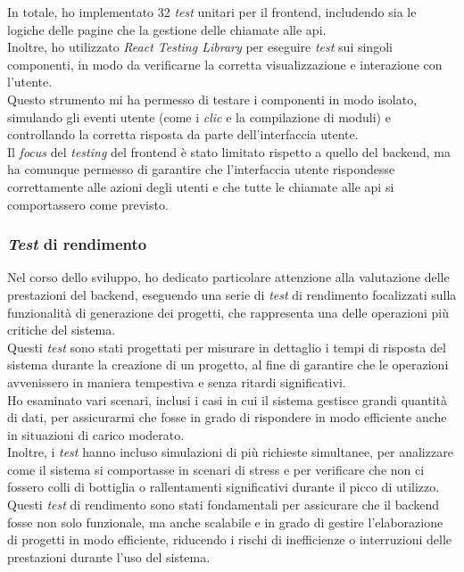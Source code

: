 \noindent In totale, ho implementato 32 \textit{test} unitari per il \gls{frontend}, includendo sia le logiche delle pagine che la gestione delle chiamate alle \gls{api}.\\
Inoltre, ho utilizzato \textit{React Testing Library} per eseguire \textit{test} sui singoli componenti, in modo da verificarne la corretta visualizzazione e interazione con l'utente. \\
Questo strumento mi ha permesso di testare i componenti in modo isolato, simulando gli eventi utente (come i \textit{clic} e la compilazione di moduli) e controllando la corretta risposta da parte dell'interfaccia utente.\\

\noindent Il \textit{focus} del \textit{testing} del \gls{frontend} è stato limitato rispetto a quello del \gls{backend}, ma ha comunque permesso di garantire che l'interfaccia utente rispondesse correttamente alle azioni degli utenti e che tutte le chiamate alle \gls{api} si comportassero come previsto.


\subsubsection{\textit{Test} di rendimento}  

Nel corso dello sviluppo, ho dedicato particolare attenzione alla valutazione delle prestazioni del \gls{backend}, eseguendo una serie di \textit{test} di rendimento focalizzati sulla funzionalità di generazione dei progetti, che rappresenta una delle operazioni più critiche del sistema. \\

\noindent Questi \textit{test} sono stati progettati per misurare in dettaglio i tempi di risposta del sistema durante la creazione di un progetto, al fine di garantire che le operazioni avvenissero in maniera tempestiva e senza ritardi significativi. \\
Ho esaminato vari scenari, inclusi i casi in cui il sistema gestisce grandi quantità di dati, per assicurarmi che fosse in grado di rispondere in modo efficiente anche in situazioni di carico moderato.\\

\noindent Inoltre, i \textit{test} hanno incluso simulazioni di più richieste simultanee, per analizzare come il sistema si comportasse in scenari di stress e per verificare che non ci fossero colli di bottiglia o rallentamenti significativi durante il picco di utilizzo. \\

\noindent Questi \textit{test} di rendimento sono stati fondamentali per assicurare che il \gls{backend} fosse non solo funzionale, ma anche scalabile e in grado di gestire l'elaborazione di progetti in modo efficiente, riducendo i rischi di inefficienze o interruzioni delle prestazioni durante l'uso del sistema.

